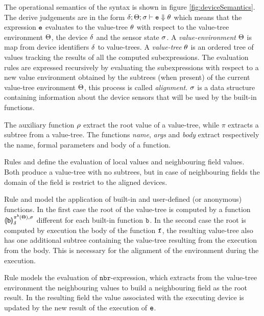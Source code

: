 The operational semantics of the syntax is shown in figure \ref{fig:deviceSemantics}. The derive judgements are in the form $\delta;\Theta;\sigma\vdash \mathtt{e}\Downarrow \theta$ which means that the expression $\mathtt{e}$ evaluates to the value-tree $\theta$ with respect to the value-tree environment $\Theta$, the device $\delta$ and the sensor state $\sigma$. A \textit{value-environment} $\Theta$ is map from device identifiers $\delta$ to value-trees. A \textit{value-tree} $\theta$ is an ordered tree of values tracking the results of all the computed subexpressions. The evaluation rules are expressed recursively by evaluating the subexpressions with respect to a new value environment obtained by the subtrees (when present) of the current value-tree environment $\Theta$, this process is called \textit{alignment}. $\sigma$ is a data structure containing information about the device sensors that will be used by the built-in functions.

The auxiliary function $\mathbf{\rho}$ extract the root value of a value-tree, while $\pi$ extracts a subtree from a value-tree. The functions \textit{name}, \textit{args} and \textit{body} extract respectively the name, formal parameters and body of a function.

Rules  and  define the evaluation of local values and neighbouring field values. Both produce a value-tree with no subtrees, but in case of neighbouring fields the domain of the field is restrict to the aligned devices.

Rule  and  model the application of built-in and user-defined (or anonymous) functions. In the first case the root of the value-tree is computed by a function $\llparenthesis \mathtt{b} \rrparenthesis_{ \delta{}}^{\pi^{\mathtt{b}}(\Theta),\sigma}$ different for each built-in function $\mathtt{b}$. In the second case the root is computed by execution the body of the function $\mathtt{f}$, the resulting value-tree also has one additional subtree containing the value-tree resulting from the execution from the body. This is necessary for the alignment of the environment during the execution.

Rule  models the evaluation of $\mathtt{nbr}$-expression, which extracts from the value-tree environment the neighbouring values to build a neighbouring field as the root result. In the resulting field the value associated with the executing device is updated by the new result of the execution of $\mathtt{e}$.

